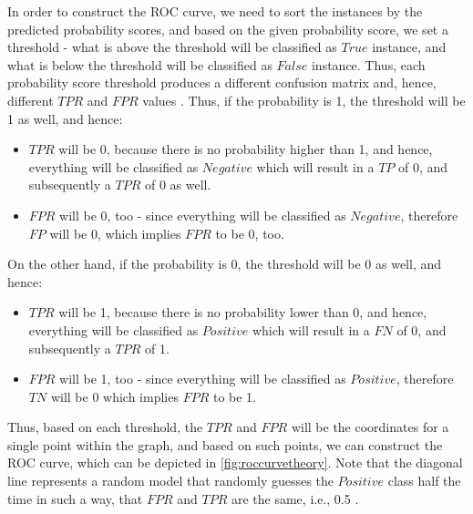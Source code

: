 In order to construct the ROC curve, we need to sort the instances by the predicted probability scores, and based on the given probability score, we set a threshold - what is above the threshold will be classified as $True$ instance, and what is below the threshold will be classified as $False$ instance. Thus, each probability score threshold produces a different confusion matrix and, hence, different $TPR$ and $FPR$ values \citep{fawcett2006introduction}.
Thus, if the probability is 1, the threshold will be 1 as well, and hence:
\begin{itemize}\setlength\itemsep{0em}
\item $TPR$ will be 0, because there is no probability higher than 1, and hence, everything will be classified as $Negative$ which will result in a $TP$ of 0, and subsequently a $TPR$ of 0 as well.
\item $FPR$ will be 0, too - since everything will be classified as $Negative$, therefore $FP$ will be 0, which implies $FPR$ to be 0, too.
\end{itemize}
On the other hand, if the probability is 0, the threshold will be 0 as well, and hence:
\begin{itemize}\setlength\itemsep{0em}
\item $TPR$ will be 1, because there is no probability lower than 0, and hence, everything will be classified as $Positive$ which will result in a $FN$ of 0, and subsequently a $TPR$ of 1.
\item $FPR$ will be 1, too - since everything will be classified as $Positive$, therefore $TN$ will be 0 which implies $FPR$ to be 1.
\end{itemize}


Thus, based on each threshold, the $TPR$ and $FPR$ will be the coordinates for a single point within the graph, and based on such points, we can construct the ROC curve, which can be depicted in \autoref{fig:roccurvetheory}.
Note that the diagonal line represents a random model that randomly guesses the $Positive$ class half the time in such a way, that $FPR$ and $TPR$ are the same, i.e., 0.5 \citep{fawcett2006introduction}.


